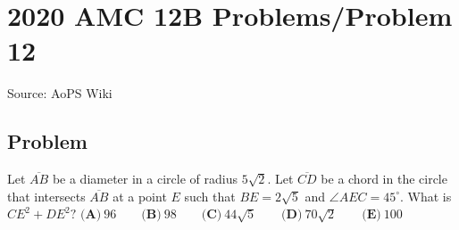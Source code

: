 \documentclass[12pt]{article}
\begin{document}
\section*{{2020 AMC 12B Problems/Problem 12}}
Source: AoPS Wiki

\subsection*{Problem}
Let $\overline{AB}$ be a diameter in a circle of radius $5\sqrt2.$ Let $\overline{CD}$ be a chord in the circle that intersects $\overline{AB}$ at a point $E$ such that $BE=2\sqrt5$ and $\angle AEC = 45^{\circ}.$ What is $CE^2+DE^2?$ $\textbf{(A)}\ 96 \qquad\textbf{(B)}\ 98 \qquad\textbf{(C)}\ 44\sqrt5 \qquad\textbf{(D)}\ 70\sqrt2 \qquad\textbf{(E)}\ 100$
\end{document}
